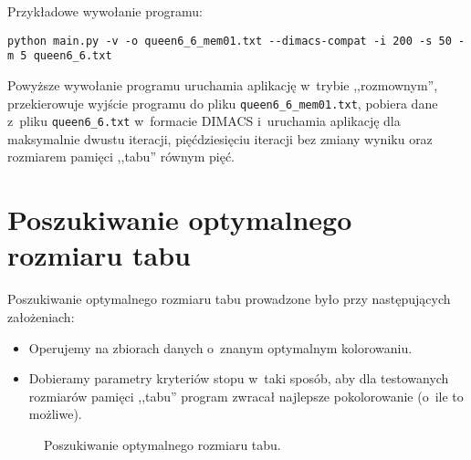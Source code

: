 \documentclass[a4paper,10pt]{article}
\begin{document}
\noindent Przykładowe wywołanie programu:

\begin{verbatim}
python main.py -v -o queen6_6_mem01.txt --dimacs-compat -i 200 -s 50 -m 5 queen6_6.txt
\end{verbatim}

\noindent Powyższe wywołanie programu uruchamia aplikację w~trybie ,,rozmownym'', przekierowuje wyjście programu do pliku \verb+queen6_6_mem01.txt+, pobiera dane z~pliku \verb+queen6_6.txt+ w~formacie DIMACS i~uruchamia aplikację dla maksymalnie dwustu iteracji, pięćdziesięciu iteracji bez zmiany wyniku oraz rozmiarem pamięci ,,tabu'' równym pięć.

\section*{Poszukiwanie optymalnego rozmiaru tabu}

Poszukiwanie optymalnego rozmiaru tabu prowadzone było przy następujących założeniach:

\begin{itemize}
    \item Operujemy na zbiorach danych o~znanym optymalnym kolorowaniu.
    \item Dobieramy parametry kryteriów stopu w~taki sposób, aby dla testowanych rozmiarów pamięci ,,tabu'' program zwracał najlepsze pokolorowanie (o~ile to możliwe).
\end{itemize}

\begin{figure}[ht!]
    \centering
    \caption{Poszukiwanie optymalnego rozmiaru tabu.}
\end{figure}
\end{document}
